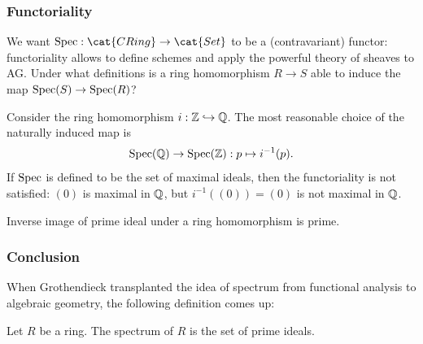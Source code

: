 \documentclass[10pt,handout]{beamer}
\begin{document}
\begin{frame}
\frametitle{Functoriality}
  We want $\Spec:\cat{CRing}\to\cat{Set}$ to be a (contravariant) functor:\\
  functoriality allows to define schemes and apply the powerful theory of sheaves to AG.
  \pause Under what definitions is a ring homomorphism $R\to S$ able to induce the map $\operatorname{Spec}(S)\to\operatorname{Spec}(R)$? \pause
  \begin{ex}
    Consider the ring homomorphism $i:\mathbb{Z}\hookrightarrow\mathbb{Q}$.
    The most reasonable choice of the naturally induced map is
    \[\operatorname{Spec}(\mathbb{Q})\to\operatorname{Spec}(\mathbb{Z}):p\mapsto i^{-1}(p).\]
    \pause If $\operatorname{Spec}$ is defined to be the set of maximal ideals, then the functoriality is not satisfied: $(0)$ is maximal in $\mathbb{Q}$, but $i^{-1}((0))=(0)$ is not maximal in $\mathbb{Q}$.
  \end{ex}
  \pause
  \begin{prop}
    Inverse image of prime ideal under a ring homomorphism is prime.
  \end{prop}
\end{frame}

\begin{frame}
\frametitle{Conclusion}
  When Grothendieck transplanted the idea of spectrum from functional analysis to algebraic geometry, the following definition comes up:
  \begin{defn}
    Let $R$ be a ring.
    The spectrum of $R$ is the set of prime ideals.
  \end{defn}
\end{frame}
\end{document}

